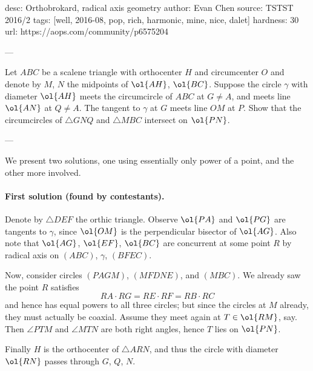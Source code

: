 desc: Orthobrokard, radical axis geometry
author: Evan Chen
source: TSTST 2016/2
tags: [well, 2016-08, pop, rich, harmonic, mine, nice, dalet]
hardness: 30
url: https://aops.com/community/p6575204

---

Let $ABC$ be a scalene triangle with orthocenter $H$ and circumcenter $O$
and denote by $M$, $N$ the midpoints of $\ol{AH}$, $\ol{BC}$.
Suppose the circle $\gamma$ with diameter $\ol{AH}$ meets
the circumcircle of $ABC$ at $G \neq A$,
and meets line $\ol{AN}$ at $Q \neq A$.
The tangent to $\gamma$ at $G$ meets line $OM$ at $P$.
Show that the circumcircles of $\triangle GNQ$
and $\triangle MBC$ intersect on $\ol{PN}$.

---

We present two solutions,
one using essentially only power of a point,
and the other more involved.

\paragraph{First solution (found by contestants).}
Denote by $\triangle DEF$ the orthic triangle.
Observe $\ol{PA}$ and $\ol{PG}$ are tangents to $\gamma$,
since $\ol{OM}$ is the perpendicular bisector of $\ol{AG}$.
Also note that $\ol{AG}$, $\ol{EF}$, $\ol{BC}$ are concurrent at some point $R$
by radical axis on $(ABC)$, $\gamma$, $(BFEC)$.

Now, consider circles $(PAGM)$, $(MFDNE)$, and $(MBC)$.
We already saw the point $R$ satisfies
\[ RA \cdot RG = RE \cdot RF = RB \cdot RC \]
and hence has equal powers to all three circles;
but since the circles at $M$ already, they must actually be coaxial.
Assume they meet again at $T \in \ol{RM}$, say.
Then $\angle PTM$ and $\angle MTN$ are both right angles, hence $T$ lies on $\ol{PN}$.

Finally $H$ is the orthocenter of $\triangle ARN$,
and thus the circle with diameter $\ol{RN}$ passes through $G$, $Q$, $N$.

